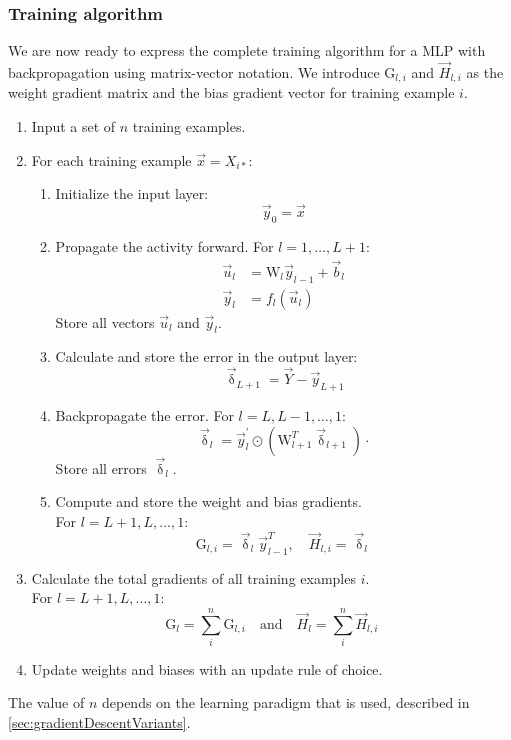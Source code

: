 \documentclass[twoside,english]{uiofysmaster}
\begin{document}
\subsubsection{Training algorithm}
We are now ready to express the complete training algorithm for a MLP with backpropagation using
matrix-vector notation. We introduce $\mathrm{G}_{l,i}$ and $\vec{H}_{l,i}$ as the weight gradient matrix and 
the bias gradient vector for training example $i$. 
\begin{enumerate}
 \item Input a set of $n$ training examples.
 \item For each training example $\vec{x} = X_{i*}$:
 \begin{enumerate}
 \item Initialize the input layer:
 \begin{equation}
  \vec{y}_0 = \vec{x}
 \end{equation}
 \item Propagate the activity forward. For $l = 1,\dots,L+1$:
 \begin{align}
  \vec{u}_l &= \mathrm{W}_l\vec{y}_{l-1} + \vec{b}_l \\
  \vec{y}_l &= f_l(\vec{u}_l)
  \label{forwardPropMatrix}
 \end{align}
 Store all vectors $\vec{u}_l$ and $\vec{y}_l$.
 \item Calculate and store the error in the output layer:
 \begin{equation}
  \vec{\updelta}_{L+1} = \vec{Y} - \vec{y}_{L+1}
 \end{equation}
 \item Backpropagate the error. For $l = L, L-1, \dots ,1$:
 \begin{equation}
 \vec{\updelta}_l = \vec{y}^\prime_l \odot (\mathrm{W}^T_{l+1}\vec{\updelta}_{l+1}) \cdot 
 \label{backPropMatrix}
 \end{equation}
 Store all errors $\vec{\updelta}_l$. 
 \item Compute and store the weight and bias gradients. \\ For $l = L+1, L, \dots ,1$:
 \begin{equation}
  \mathrm{G}_{l,i} = \vec{\updelta}_l \vec{y}_{l-1}^T, \quad \vec{H}_{l,i} = \vec{\updelta}_l
  \label{weightUpdate}
 \end{equation}
 \end{enumerate}
 \item Calculate the total gradients of all training examples $i$. \\
 For $l = L+1, L, \dots ,1$:
 \begin{equation}
  \mathrm{G}_l = \sum_i^n \mathrm{G}_{l,i} \quad \mathrm{and} \quad
  \vec{H}_l = \sum_i^n \vec{H}_{l,i}
 \end{equation}
 \item Update weights and biases with an update rule of choice. 
\end{enumerate}
The value of $n$ depends on the learning paradigm that is used, described in \autoref{sec:gradientDescentVariants}. 
\end{document}
